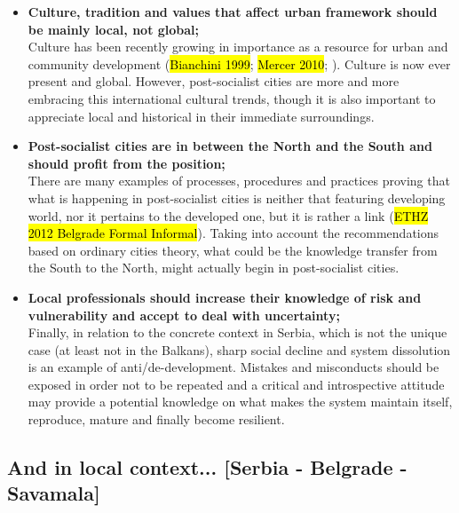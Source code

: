 \documentclass[11pt]{report}
\begin{document}
\begin{itemize}
\item \textbf{Culture, tradition and values that affect urban framework should be mainly local, not global;}
\\
Culture has been recently growing in importance as a resource for urban  and  community development (\hl{Bianchini 1999}; \hl{Mercer 2010}; \cite{Volic et al. 2012}).
Culture is now ever present and global. 
However, post-socialist cities are more and more embracing this international cultural trends, though it is also important to appreciate local and historical in their immediate surroundings.

\item \textbf{Post-socialist cities are in between the North and the South and should profit from the position;}
\\
There are many examples of processes, procedures and practices proving that what is happening in post-socialist cities is neither that featuring developing world, nor it pertains to the developed one, but it is rather a link (\hl{ETHZ 2012 Belgrade Formal Informal}).
Taking into account the recommendations based on ordinary cities theory, what could be the knowledge transfer from the South to the North, might actually begin in post-socialist cities.

\item {\textbf{Local professionals should increase their knowledge of risk and vulnerability and accept to deal with uncertainty;}}
\\
Finally, in relation to the concrete context in Serbia, which is not the unique case (at least not in the Balkans), sharp social decline and system dissolution is an example of anti/de-development.
Mistakes and misconducts should be exposed in order not to be repeated and a critical and introspective attitude may provide a potential knowledge on what makes the system maintain itself, reproduce, mature and finally become resilient.
\end{itemize}

\subsection{And in local context... [Serbia - Belgrade - Savamala]}
\end{document}

